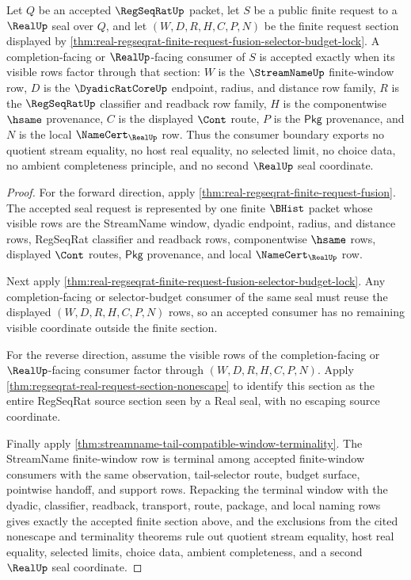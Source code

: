 \begin{theorem}
\label{thm:real-regseqrat-completion-consumer-section-exactness}
Let $Q$ be an accepted $\RegSeqRatUp$ packet, let $S$ be a public finite request to a $\RealUp$ seal over $Q$, and let $(W,D,R,H,C,P,N)$ be the finite request section displayed by \autoref{thm:real-regseqrat-finite-request-fusion-selector-budget-lock}. A completion-facing or $\RealUp$-facing consumer of $S$ is accepted exactly when its visible rows factor through that section: $W$ is the $\StreamNameUp$ finite-window row, $D$ is the $\DyadicRatCoreUp$ endpoint, radius, and distance row family, $R$ is the $\RegSeqRatUp$ classifier and readback row family, $H$ is the componentwise $\hsame$ provenance, $C$ is the displayed $\Cont$ route, $P$ is the $\mathsf{Pkg}$ provenance, and $N$ is the local $\NameCert_{\RealUp}$ row. Thus the consumer boundary exports no quotient stream equality, no host real equality, no selected limit, no choice data, no ambient completeness principle, and no second $\RealUp$ seal coordinate.
\end{theorem}
\begin{proof}
For the forward direction, apply \autoref{thm:real-regseqrat-finite-request-fusion}. The accepted seal request is represented by one finite $\BHist$ packet whose visible rows are the StreamName window, dyadic endpoint, radius, and distance rows, RegSeqRat classifier and readback rows, componentwise $\hsame$ rows, displayed $\Cont$ routes, $\mathsf{Pkg}$ provenance, and local $\NameCert_{\RealUp}$ row.

Next apply \autoref{thm:real-regseqrat-finite-request-fusion-selector-budget-lock}. Any completion-facing or selector-budget consumer of the same seal must reuse the displayed $(W,D,R,H,C,P,N)$ rows, so an accepted consumer has no remaining visible coordinate outside the finite section.

For the reverse direction, assume the visible rows of the completion-facing or $\RealUp$-facing consumer factor through $(W,D,R,H,C,P,N)$. Apply \autoref{thm:regseqrat-real-request-section-nonescape} to identify this section as the entire RegSeqRat source section seen by a Real seal, with no escaping source coordinate.

Finally apply \autoref{thm:streamname-tail-compatible-window-terminality}. The StreamName finite-window row is terminal among accepted finite-window consumers with the same observation, tail-selector route, budget surface, pointwise handoff, and support rows. Repacking the terminal window with the dyadic, classifier, readback, transport, route, package, and local naming rows gives exactly the accepted finite section above, and the exclusions from the cited nonescape and terminality theorems rule out quotient stream equality, host real equality, selected limits, choice data, ambient completeness, and a second $\RealUp$ seal coordinate.
\end{proof}

